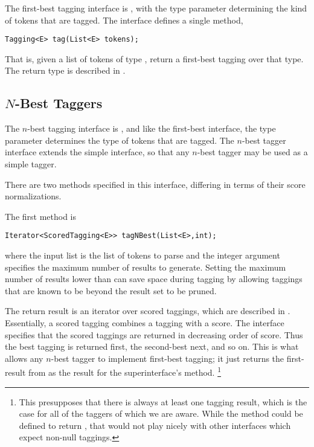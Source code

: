 The first-best tagging interface is , with the
type parameter  determining the kind of tokens that
are tagged.  The interface defines a single method,
%
\begin{verbatim}
Tagging<E> tag(List<E> tokens);
\end{verbatim}
%
That is, given a list of tokens of type , return a first-best
tagging over that type.  The return type  is described
in .

\subsection{$N$-Best Taggers}

The $n$-best tagging interface is , and
like the first-best interface, the type parameter 
determines the type of tokens that are tagged.  The $n$-best
tagger interface extends the simple  interface,
so that any $n$-best tagger may be used as a simple tagger.

There are two methods specified in this interface, differing in terms
of their score normalizations.

The first method is
%
\begin{verbatim}
Iterator<ScoredTagging<E>> tagNBest(List<E>,int);
\end{verbatim}
%
where the input list is the list of tokens to parse and the integer
argument specifies the maximum number of results to generate.  Setting
the maximum number of results lower than  can
save space during tagging by allowing taggings that are known to be
beyond the result set to be pruned.  

The return result is an iterator over scored taggings, which are
described in .  Essentially, a scored
tagging combines a tagging with a score.  The interface specifies that
the scored taggings are returned in decreasing order of score.  Thus
the best tagging is returned first, the second-best next, and so on.
This is what allows any $n$-best tagger to implement first-best
tagging; it just returns the first-result from  as
the result for the superinterface's  method.%
%
\footnote{This presupposes that there is always at least one tagging
  result, which is the case for all of the taggers of which we are
  aware.  While the  method could be defined to return
  , that would not play nicely with other interfaces which
  expect non-null taggings.}

